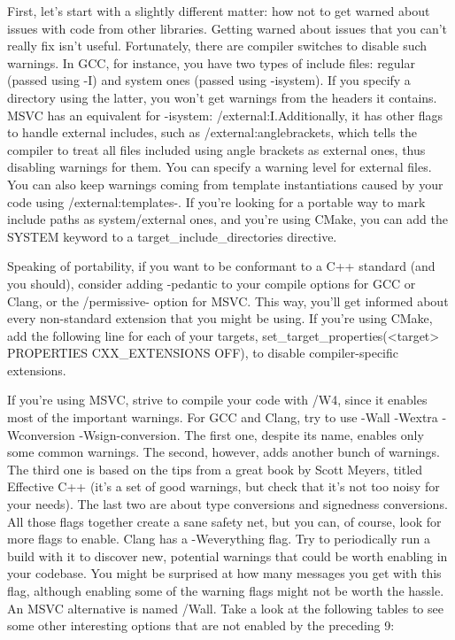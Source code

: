 First, let's start with a slightly different matter: how not to get warned about issues with code from other libraries. Getting warned about issues that you can't really fix isn't useful. Fortunately, there are compiler switches to disable such warnings. In GCC, for instance, you have two types of include files: regular (passed using -I) and system ones (passed using -isystem). If you specify a directory using the latter, you won't get warnings from the headers it contains. MSVC has an equivalent for -isystem: /external:I.Additionally, it has other flags to handle external includes, such as /external:anglebrackets, which tells the compiler to treat all files included using angle brackets as external ones, thus disabling warnings for them. You can specify a warning level for external files. You can also keep warnings coming from template instantiations caused by your code using /external:templates-. If you're looking for a portable way to mark include paths as system/external ones, and you're using CMake, you can add the SYSTEM keyword to a target\_include\_directories directive.

Speaking of portability, if you want to be conformant to a C++ standard (and you should), consider adding -pedantic to your compile options for GCC or Clang, or the /permissive- option for MSVC. This way, you'll get informed about every non-standard extension that you might be using. If you're using CMake, add the following line for each of your targets, set\_target\_properties(<target> PROPERTIES CXX\_EXTENSIONS OFF), to disable compiler-specific extensions.

If you're using MSVC, strive to compile your code with /W4, since it enables most of the important warnings. For GCC and Clang, try to use -Wall -Wextra -Wconversion -Wsign-conversion. The first one, despite its name, enables only some common warnings. The second, however, adds another bunch of warnings. The third one is based on the tips from a great book by Scott Meyers, titled Effective C++ (it's a set of good warnings, but check that it's not too noisy for your needs). The last two are about type conversions and signedness conversions. All those flags together create a sane safety net, but you can, of course, look for more flags to enable. Clang has a -Weverything flag. Try to periodically run a build with it to discover new, potential warnings that could be worth enabling in your codebase. You might be surprised at how many messages you get with this flag, although enabling some of the warning flags might not be worth the hassle. An MSVC alternative is named /Wall. Take a look at the following tables to see some other interesting options that are not enabled by the preceding 9:

